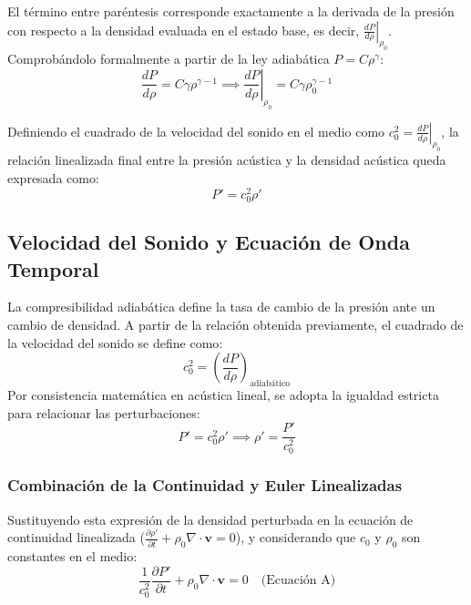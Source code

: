 \documentclass[11pt,letterpaper]{article}
\begin{document}
El término entre paréntesis corresponde exactamente a la derivada de la presión con respecto a la densidad evaluada en el estado base, es decir, $\left. \frac{dP}{d\rho} \right|_{\rho_0}$. Comprobándolo formalmente a partir de la ley adiabática $P = C \rho^\gamma$:
\begin{equation}
    \frac{dP}{d\rho} = C \gamma \rho^{\gamma-1} \implies \left. \frac{dP}{d\rho} \right|_{\rho_0} = C \gamma \rho_0^{\gamma-1}
\end{equation}

Definiendo el cuadrado de la velocidad del sonido en el medio como $c_0^2 = \left. \frac{dP}{d\rho} \right|_{\rho_0}$, la relación linealizada final entre la presión acústica y la densidad acústica queda expresada como:
\begin{equation}
    P' = c_0^2 \rho'
\end{equation}

\subsection{Velocidad del Sonido y Ecuación de Onda Temporal}

La compresibilidad adiabática define la tasa de cambio de la presión ante un cambio de densidad. A partir de la relación obtenida previamente, el cuadrado de la velocidad del sonido se define como:
\begin{equation}
    c_0^2 = \left( \frac{dP}{d\rho} \right)_{\text{adiabático}}
\end{equation}
Por consistencia matemática en acústica lineal, se adopta la igualdad estricta para relacionar las perturbaciones:
\begin{equation}
    P' = c_0^2 \rho' \implies \rho' = \frac{P'}{c_0^2}
\end{equation}

\subsubsection{Combinación de la Continuidad y Euler Linealizadas}
Sustituyendo esta expresión de la densidad perturbada en la ecuación de continuidad linealizada ($\frac{\partial \rho'}{\partial t} + \rho_0 \nabla \cdot \mathbf{v} = 0$), y considerando que $c_0$ y $\rho_0$ son constantes en el medio:
\begin{equation}
    \frac{1}{c_0^2} \frac{\partial P'}{\partial t} + \rho_0 \nabla \cdot \mathbf{v} = 0 \quad \text{(Ecuación A)}
\end{equation}
\end{document}
